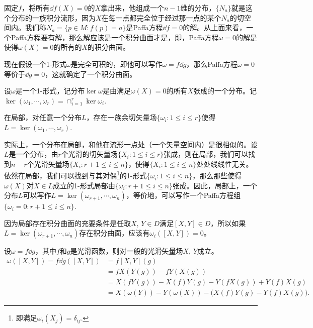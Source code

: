 固定$f$，将所有$\dd f(X)=0$的$X$拿出来，他组成一个$n-1$维的分布，$\{N_a\}$就是这个分布的一族积分流形，因为$X$在每一点都完全位于经过那一点的某个$N_a$的切空间内。我们称$N_a=\{p\in M:f(p)=a\}$是Paffa方程$\dd f=0$的解。从上面来看，一个Paffa方程要有解，那么解应该是一个积分曲面才是，即，Paffa方程$\omega=0$的解是使得$\omega(X)=0$的所有的$X$的积分曲面。

现在假设一个1-形式$\omega$是完全可积的，即他可以写作$\omega=f\dd g$，那么Paffa方程$\omega=0$等价于$\dd g=0$，这就确定了一个积分曲面。

\para 设$\omega$是一个1-形式，记分布$\ker \omega$是由满足$\omega(X)=0$的所有$X$张成的一个分布。记$\ker(\omega_1,\cdots,\omega_r)=\cap_{i=1}^r\ker \omega_i$.


\para 在局部，对任意一个分布$L$，存在一族余切矢量场$\{\omega_i:1\leq i \leq r\}$使得$L=\ker(\omega_1,\cdots,\omega_r)$.

实际上，一个分布在局部，和他在流形一点处（一个矢量空间内）是很相似的。设$L$是一个分布，由$r$个光滑的切矢量场$\{X_i:1\leq i \leq r\}$张成，则在局部，我们可以找到$n-r$个光滑矢量场$\{X_i:r+1\leq i \leq n\}$，使得$\{X_i:1\leq i \leq n\}$处处线线性无关。依然在局部，我们可以找到与其对偶\footnote{即满足$\omega_i(X_j)=\delta_{ij}$.}的1-形式$\{\omega_i:1\leq i \leq n\}$，那么那些使得$\omega(X)$对$X\in L$成立的1-形式局部由$\{\omega_i:r+1\leq i \leq n\}$张成。因此，局部上，一个分布$L$可以写作$L=\ker(\omega_{r+1},\cdots,\omega_n)$，等价地，可以写作一个Paffa方程组$\{\omega_i=0:r+1\leq i \leq n\}$.

因为局部存在积分曲面的充要条件是任取$X$, $Y\in D$满足$[X,Y]\in D$，所以如果$L=\ker(\omega_{r+1},\cdots,\omega_n)$存在积分曲面，应该有$\omega_i([X,Y])=0$。

\para 设$\omega=f\dd g$，其中$f$和$g$是光滑函数，则对一般的光滑矢量场$X$, $Y$成立。
\begin{equation}
\begin{split}
	\omega([X,Y])=f\dd g([X,Y])&=f [X,Y](g)\\
	&=fX(Y(g))-fY(X(g))\\
	&=X(fY(g))-X(f)Y(g)-Y(fX(g))+Y(f)X(g)\\
	&=X(\omega(Y))-Y(\omega(X))-\bigl(X(f)Y(g)-Y(f)X(g)\bigr).
\end{split}
\end{equation}

